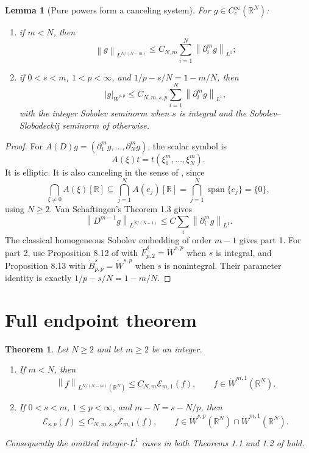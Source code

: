 \documentclass[11pt]{article}
\newtheorem{theorem}{Theorem}
\newtheorem{lemma}{Lemma}
\newcommand{\R}{\mathbb R}
\newcommand{\E}{\mathscr E}
\newcommand{\norm}[1]{\left\lVert #1\right\rVert}
\newcommand{\abs}[1]{\left\lvert #1\right\rvert}
\begin{document}
\begin{lemma}[Pure powers form a canceling system]\label{lem:canceling}
For \(g\in C_c^\infty(\R^N)\):
\begin{enumerate}
\item if \(m<N\), then
\[
 \norm{g}_{L^{N/(N-m)}}\leq C_{N,m}
 \sum_{i=1}^N\norm{\partial_i^m g}_{L^1};
\]
\item if \(0<s<m\), \(1<p<\infty\), and
\(1/p-s/N=1-m/N\), then
\[
 \abs{g}_{\dot W^{s,p}}\leq C_{N,m,s,p}
 \sum_{i=1}^N\norm{\partial_i^m g}_{L^1},
\]
with the integer Sobolev seminorm when \(s\) is integral and the
Sobolev--Slobodeckij seminorm of \cite{BG} otherwise.
\end{enumerate}
\end{lemma}

\begin{proof}
For \(A(D)g=(\partial_1^m g,\ldots,\partial_N^m g)\), the scalar symbol is
\[
 A(\xi)t=t(\xi_1^m,\ldots,\xi_N^m).
\]
It is elliptic.  It is also canceling in the sense of \cite{VS}, since
\[
 \bigcap_{\xi\neq0}A(\xi)[\R]
 \subseteq\bigcap_{j=1}^N A(e_j)[\R]
 =\bigcap_{j=1}^N\operatorname{span}\{e_j\}=\{0\},
\]
using \(N\geq2\).  Van Schaftingen's Theorem 1.3 \cite{VS} gives
\[
 \norm{D^{m-1}g}_{L^{N/(N-1)}}
 \leq C\sum_i\norm{\partial_i^m g}_{L^1}.
\]
The classical homogeneous Sobolev embedding of order \(m-1\) gives part 1.
For part 2, use Proposition 8.12 of \cite{VS} with
\(\dot F^s_{p,2}=\dot W^{s,p}\) when \(s\) is integral, and Proposition 8.13
with \(\dot B^s_{p,p}=\dot W^{s,p}\) when \(s\) is nonintegral.  Their
parameter identity is exactly \(1/p-s/N=1-m/N\).
\end{proof}

\section{Full endpoint theorem}

\begin{theorem}\label{thm:main}
Let \(N\geq2\) and let \(m\geq2\) be an integer.
\begin{enumerate}
\item If \(m<N\), then
\[
 \norm{f}_{L^{N/(N-m)}(\R^N)}
 \leq C_{N,m}\E_{m,1}(f),
 \qquad f\in\mathring W^{m,1}(\R^N).
\]
\item If \(0<s<m\), \(1\leq p<\infty\), and
\(m-N=s-N/p\), then
\[
 \E_{s,p}(f)\leq C_{N,m,s,p}\E_{m,1}(f),
 \qquad
 f\in\dot W^{s,p}(\R^N)\cap\dot W^{m,1}(\R^N).
\]
\end{enumerate}
Consequently the omitted integer-\(L^1\) cases in both Theorems 1.1 and 1.2
of \cite{BG} hold.
\end{theorem}
\end{document}
